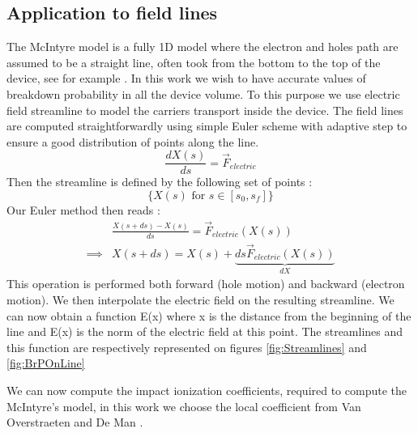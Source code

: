 \documentclass[10pt,a4paper,twocolumn]{article}
\begin{document}
\subsection{Application to field lines}
The McIntyre model is a fully 1D model where the electron and holes path are assumed to be a straight line, often took from the bottom to the top of the device, see for example \cite{panglosse_dark_2020}. In this work we wish to have accurate values of breakdown probability in all the device volume. To this purpose we use electric field streamline to model the carriers transport inside the device. 
The field lines are computed straightforwardly using simple Euler scheme with adaptive step to ensure a good distribution of points along the line.
\begin{equation}
	\frac{dX(s)}{ds} = \vec{F}_{electric}
\end{equation}
Then the streamline is defined by the following set of points : \[ \{X(s) \text{ for } s \in [s_0, s_f]   \} \]
Our Euler method then reads : 
\begin{align}
	&\frac{X(s+ds)-X(s)}{ds} = \vec{F}_{electric}(X(s)) \\
	\implies & X(s+ds) = X(s) + \underbrace{ds\vec{F}_{electric}(X(s))}_{dX}
\end{align}
This operation is performed both forward (hole motion) and backward (electron motion). We then interpolate the electric field on the resulting streamline.
We can now obtain a function E(x) where x is the distance from the beginning of the line and E(x) is the norm of the electric field at this point. The streamlines and this function are respectively represented on figures \ref{fig:Streamlines} and \ref{fig:BrPOnLine}




We can now compute the impact ionization coefficients, required to compute the McIntyre's model, in this work we choose the local coefficient from Van Overstraeten and De Man \cite{van_overstraeten_measurement_1970}.
\end{document}
